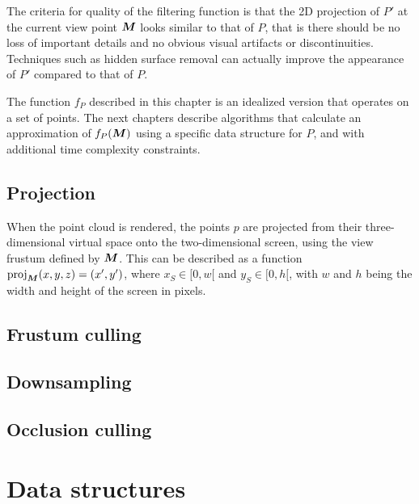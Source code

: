 \documentclass[a4paper,11pt,abstracton,notitlepage]{scrreprt}
\begin{document}
The criteria for quality of the filtering function is that the 2D projection of $P'$ at the current view point $\matrixsym{M}$ looks similar to that of $P$, that is there should be no loss of important details and no obvious visual artifacts or discontinuities. Techniques such as hidden surface removal can actually improve the appearance of $P'$ compared to that of $P$.

The function $f_{P}$ described in this chapter is an idealized version that operates on a set of points. The next chapters describe algorithms that calculate an approximation of $f_{P}(\matrixsym{M})$ using a specific data structure for $P$, and with additional time complexity constraints.


\section{Projection}
When the point cloud is rendered, the points $p$ are projected from their three-dimensional virtual space onto the two-dimensional screen, using the view frustum defined by $\matrixsym{M}$. This can be described as a function $\mathrm{proj}_{\matrixsym{M}}(x, y, z) = (x', y')$, where $x_{S} \in [0, w[$ and $y_{S} \in [0, h[$, with $w$ and $h$ being the width and height of the screen in pixels.




\section{Frustum culling}
\section{Downsampling}
\section{Occlusion culling}


\chapter{Data structures}



\end{document}
